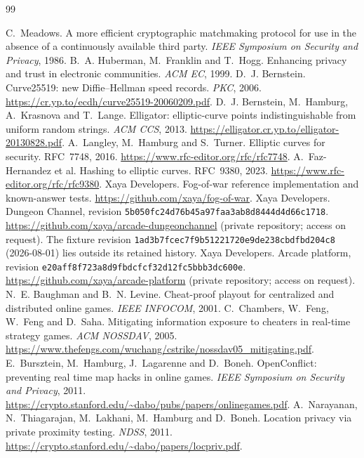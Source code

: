 \documentclass[11pt]{article}
\begin{document}
\begin{thebibliography}{99}
\raggedright
{} C.~Meadows. A more efficient cryptographic matchmaking
protocol for use in the absence of a continuously available third party.
\emph{IEEE Symposium on Security and Privacy}, 1986.
 B.~A. Huberman, M.~Franklin and T.~Hogg. Enhancing privacy and
trust in electronic communities. \emph{ACM EC}, 1999.
 D.~J. Bernstein. Curve25519: new Diffie--Hellman speed
records. \emph{PKC}, 2006. \url{https://cr.yp.to/ecdh/curve25519-20060209.pdf}.
 D.~J. Bernstein, M.~Hamburg, A.~Krasnova and T.~Lange.
Elligator: elliptic-curve points indistinguishable from uniform random strings.
\emph{ACM CCS}, 2013. \url{https://elligator.cr.yp.to/elligator-20130828.pdf}.
 A.~Langley, M.~Hamburg and S.~Turner. Elliptic curves for
security. RFC~7748, 2016. \url{https://www.rfc-editor.org/rfc/rfc7748}.
 A.~Faz-Hernandez et al. Hashing to elliptic curves.
RFC~9380, 2023. \url{https://www.rfc-editor.org/rfc/rfc9380}.
 Xaya Developers. Fog-of-war reference implementation and
known-answer tests. \url{https://github.com/xaya/fog-of-war}.
 Xaya Developers. Dungeon Channel, revision
\texttt{5b050fc24d76b45a97faa3ab8d8444d4d66c1718}.
\url{https://github.com/xaya/arcade-dungeonchannel} (private repository;
access on request). The fixture revision
\texttt{1ad3b7fcec7f9b51221720e9de238cbdfbd204c8} (2026-08-01) lies outside
its retained history.
 Xaya Developers. Arcade platform, revision
\texttt{e20aff8f723a8d9fbdcfcf32d12fc5bbb3dc600e}.
\url{https://github.com/xaya/arcade-platform} (private repository; access on
request).
 N.~E. Baughman and B.~N. Levine. Cheat-proof playout
for centralized and distributed online games. \emph{IEEE INFOCOM}, 2001.
 C.~Chambers, W.~Feng, W.~Feng and D.~Saha. Mitigating
information exposure to cheaters in real-time strategy games. \emph{ACM
NOSSDAV}, 2005.
\url{https://www.thefengs.com/wuchang/cstrike/nossdav05_mitigating.pdf}.
 E.~Bursztein, M.~Hamburg, J.~Lagarenne and D.~Boneh.
OpenConflict: preventing real time map hacks in online games.
\emph{IEEE Symposium on Security and Privacy}, 2011.
\url{https://crypto.stanford.edu/~dabo/pubs/papers/onlinegames.pdf}.
 A.~Narayanan, N.~Thiagarajan, M.~Lakhani, M.~Hamburg and
D.~Boneh. Location privacy via private proximity testing. \emph{NDSS}, 2011.
\url{https://crypto.stanford.edu/~dabo/papers/locpriv.pdf}.

\end{thebibliography}
\end{document}
